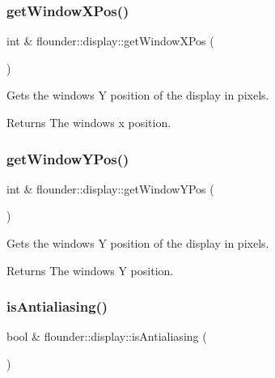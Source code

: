 \subsubsection{\texorpdfstring{get\+Window\+X\+Pos()}{getWindowXPos()}}
{\footnotesize\ttfamily int \& flounder\+::display\+::get\+Window\+X\+Pos (\begin{DoxyParamCaption}{ }\end{DoxyParamCaption})}



Gets the windows Y position of the display in pixels. 

\begin{DoxyReturn}{Returns}
The windows x position. 
\end{DoxyReturn}
\mbox{\label{classflounder_1_1display_a59dab9f2452adfce71b7d156dc9ca688}} 
\subsubsection{\texorpdfstring{get\+Window\+Y\+Pos()}{getWindowYPos()}}
{\footnotesize\ttfamily int \& flounder\+::display\+::get\+Window\+Y\+Pos (\begin{DoxyParamCaption}{ }\end{DoxyParamCaption})}



Gets the windows Y position of the display in pixels. 

\begin{DoxyReturn}{Returns}
The windows Y position. 
\end{DoxyReturn}
\mbox{\label{classflounder_1_1display_a5542894b942b11b8fa30e51e98a389ba}} 
\subsubsection{\texorpdfstring{is\+Antialiasing()}{isAntialiasing()}}
{\footnotesize\ttfamily bool \& flounder\+::display\+::is\+Antialiasing (\begin{DoxyParamCaption}{ }\end{DoxyParamCaption})}



